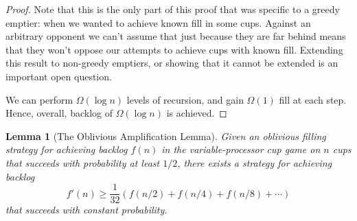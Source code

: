 \documentclass[twocolumn]{article}[11pt]
\newtheorem{lemma}{Lemma}
\begin{document}
\begin{proof}
  Note that this is the only part of this proof that was specific to a greedy
  emptier: when we wanted to achieve known fill in some cups. Against an
  arbitrary opponent we can't assume that just because they are far behind
  means that they won't oppose our attempts to achieve cups with known fill.
  Extending this result to non-greedy emptiers, or showing that it cannot be
  extended is an important open question.

  We can perform $\Omega(\log n)$ levels of recursion, and gain $\Omega(1)$
  fill at each step. Hence, overall, backlog of $\Omega(\log n)$ is achieved.
\end{proof}


\begin{lemma}[The Oblivious Amplification Lemma]
  Given an oblivious filling strategy for achieving backlog $f(n)$ in the
  variable-processor cup game on $n$ cups that succeeds with probability at
  least $1/2$, there exists a strategy for achieving backlog 
  $$f'(n) \ge \frac{1}{32}(f(n/2) + f(n/4) + f(n/8) + \cdots) $$ that succeeds
  with constant probability.
\end{lemma}
\end{document}
